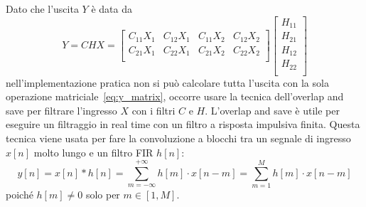 \documentclass[12pt,a4paper,titlepage]{article}
\begin{document}
Dato che l'uscita $Y$ è data da
\begin{equation}\label{eq:y_matrix}
Y = CHX = 
\begin{bmatrix}
C_{11} X_1 & C_{12} X_1 & C_{11} X_2 & C_{12} X_2 \\ 
C_{21} X_1 & C_{22} X_1 & C_{21} X_2 & C_{22} X_2 \\ 
\end{bmatrix}
\begin{bmatrix}
H_{11}\\
H_{21}\\
H_{12}\\
H_{22}\\
\end{bmatrix}
\end{equation}
nell'implementazione pratica non si può calcolare tutta l'uscita con la sola operazione matriciale~\eqref{eq:y_matrix}, occorre usare la tecnica dell'overlap and save per filtrare l'ingresso $X$ con i filtri $C$ e $H$. L'overlap and save è utile per eseguire un filtraggio in real time con un filtro a risposta impulsiva finita. Questa tecnica viene usata per fare la convoluzione a blocchi tra un segnale di ingresso $x[n]$ molto lungo e un filtro FIR $h[n]$:
\begin{equation}
y[n] = x[n] * h[n] = \sum_{m=-\infty}^{+\infty} {h[m] \cdot x[n-m]} = \sum_{m=1}^{M} {h[m] \cdot x[n-m]}
\end{equation}
poiché $h[m] \neq 0$ solo per $m \in [1, M]$.
\end{document}
